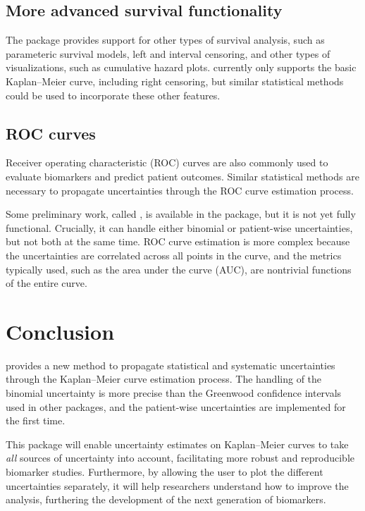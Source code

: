 \documentclass[article]{jss}
\newcommand{\KM}{Kaplan--Meier} %
\begin{document}
\subsection{More advanced survival functionality}

The  package provides support for other types of survival analysis, such as parameteric survival models, left and interval censoring, and other types of visualizations, such as cumulative hazard plots\@.  currently only supports the basic \KM{} curve, including right censoring, but similar statistical methods could be used to incorporate these other features.

\subsection{ROC curves}

Receiver operating characteristic (ROC) curves are also commonly used to evaluate biomarkers and predict patient outcomes. Similar statistical methods are necessary to propagate uncertainties through the ROC curve estimation process.

Some preliminary work, called , is available in the  package, but it is not yet fully functional. Crucially, it can handle either binomial or patient-wise uncertainties, but not both at the same time. ROC curve estimation is more complex because the uncertainties are correlated across all points in the curve, and the metrics typically used, such as the area under the curve (AUC), are nontrivial functions of the entire curve.

\section{Conclusion}

 provides a new method to propagate statistical and systematic uncertainties through the \KM{} curve estimation process. The handling of the binomial uncertainty is more precise than the Greenwood confidence intervals used in other packages, and the patient-wise uncertainties are implemented for the first time.

This package will enable uncertainty estimates on \KM{} curves to take \emph{all} sources of uncertainty into account, facilitating more robust and reproducible biomarker studies. Furthermore, by allowing the user to plot the different uncertainties separately, it will help researchers understand how to improve the analysis, furthering the development of the next generation of biomarkers.
\end{document}
